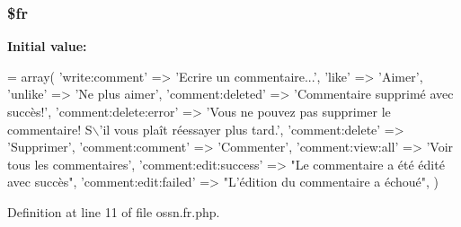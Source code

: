 \subsubsection[{\texorpdfstring{\$fr}{$fr}}]{\setlength{\rightskip}{0pt plus 5cm}\$fr}\hypertarget{components_2_ossn_comments_2locale_2ossn_8fr_8php_ad5107c697816e7b7f89ad1b3e94e3e0e}{}\label{components_2_ossn_comments_2locale_2ossn_8fr_8php_ad5107c697816e7b7f89ad1b3e94e3e0e}
{\bfseries Initial value\+:}
\begin{DoxyCode}
= array(
    \textcolor{stringliteral}{'write:comment'} => \textcolor{stringliteral}{'Ecrire un commentaire...'},
    \textcolor{stringliteral}{'like'} => \textcolor{stringliteral}{'Aimer'},
    \textcolor{stringliteral}{'unlike'} => \textcolor{stringliteral}{'Ne plus aimer'},
    \textcolor{stringliteral}{'comment:deleted'} => \textcolor{stringliteral}{'Commentaire supprimé avec succès!'},
    \textcolor{stringliteral}{'comment:delete:error'} => \textcolor{stringliteral}{'Vous ne pouvez pas supprimer le commentaire! S\(\backslash\)'il vous plaît réessayer plus
       tard.'},
    \textcolor{stringliteral}{'comment:delete'} => \textcolor{stringliteral}{'Supprimer'},
    \textcolor{stringliteral}{'comment:comment'} => \textcolor{stringliteral}{'Commenter'},
    \textcolor{stringliteral}{'comment:view:all'} => \textcolor{stringliteral}{'Voir tous les commentaires'},
    \textcolor{stringliteral}{'comment:edit:success'} => \textcolor{stringliteral}{"Le commentaire a été édité avec succès"},
    \textcolor{stringliteral}{'comment:edit:failed'} => \textcolor{stringliteral}{"L'édition du commentaire a échoué"},   
)
\end{DoxyCode}


Definition at line 11 of file ossn.\+fr.\+php.

